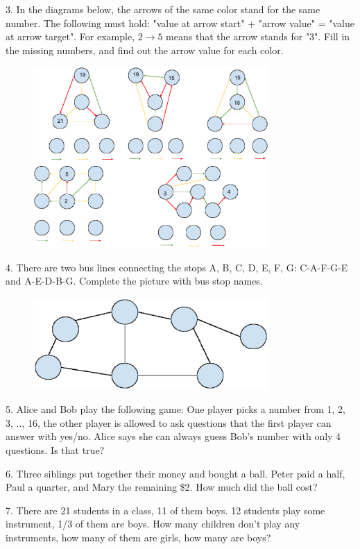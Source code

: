 \documentclass{article}
\begin{document}
\vspace{3mm}

3. In the diagrams below, the arrows of the same color stand for the same number. The following must hold: "value at arrow start" + "arrow value" = "value at arrow target". For example, $2 \rightarrow 5$ means that the arrow stands for "3". Fill in the missing numbers, and find out the arrow value for each color.

\begin{figure}[H]
  \includegraphics[width=0.8\textwidth]{pavuciny.eps}
\end{figure}


\newpage

4. There are two bus lines connecting the stops A, B, C, D, E, F, G: C-A-F-G-E and A-E-D-B-G. Complete the picture with bus stop names.

\begin{figure}[H]
  \includegraphics[width=0.8\textwidth]{buses.eps}
\end{figure}


\vspace{3mm}

5. Alice and Bob play the following game: One player picks a number from 1, 2, 3, .., 16, the other player is allowed to ask questions that the first player can answer with yes/no. Alice says she can always guess Bob's number with only 4 questions. Is that true?


\vspace{3mm}

6. Three siblings put together their money and bought a ball. Peter paid a half, Paul a quarter, and Mary the remaining \$2. How much did the ball cost?


\vspace{3mm}

7. There are 21 students in a class, 11 of them boys. 12 students play some instrument, 1/3 of them are boys. How many children don't play any instruments, how many of them are girls, how many are boys?
\end{document}
